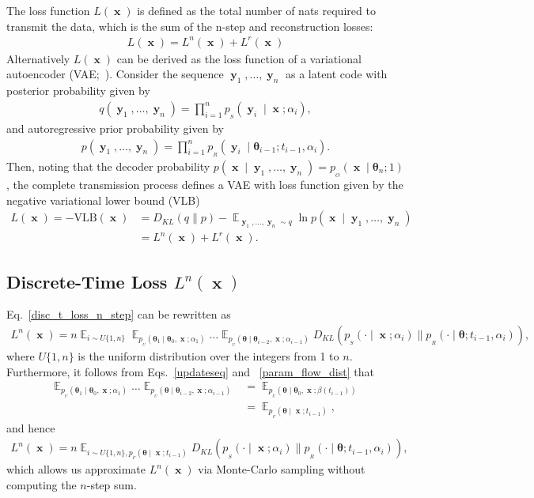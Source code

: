 \documentclass[11pt,table]{article}
\DeclareMathOperator*{\E}{\mathbb{E}}
\DeclareMathOperator{\x}{\mathbf{x}}
\DeclareMathOperator{\y}{\mathbf{y}}
\newcommand{\kl}[2]{D_{KL}\left(#1 \parallel #2\right)}
\newcommand{\tidx}[2]{#1_{#2}}
\renewcommand{\vec}[1]{\boldsymbol{#1}}
\newcommand{\pars}{\theta}
\newcommand{\parsn}{\vec{\pars}}
\newcommand{\parsnt}[1]{\tidx{\parsn}{#1}}
\newcommand{\alphat}[1]{\tidx{\alpha}{#1}}
\newcommand{\yt}[1]{\tidx{\y}{#1}}
\newcommand{\0}[1]{\constvec{0}{#1}}
\newcommand{\1}[1]{\constvec{1}{#1}}
\newcommand{\ds}[1]{\{1,#1\}}
\newcommand{\ui}[1]{U\ds{#1}}
\newcommand{\sender}[2]{p_{_S}\left(#1 \mid #2\right)}
\newcommand{\out}{p_{_O}}
\newcommand{\rec}{p_{_R}}
\newcommand{\flow}{p_{_F}}
\newcommand{\update}{p_{_U}}
\begin{document}
The loss function $L(\x)$ is defined as the total number of nats required to transmit the data, which is the sum of the n-step and reconstruction losses:
\begin{align}
L(\x) = L^n(\x) + L^r(\x)
\end{align}
Alternatively  $L(\x)$ can be derived as the loss function of a variational autoencoder (VAE;~\citep{kingma2013auto}). Consider the sequence $\yt{1},\dots,\yt{n}$ as a latent code with posterior probability given by
\begin{align}
q(\yt{1},\dots,\yt{n}) = \prod_{i=1}^n \sender{\y_i}{\x; \alpha_i},
\end{align}
and autoregressive prior probability given by
\begin{align}
p(\yt{1},\dots,\yt{n}) = \prod_{i=1}^n \rec(\y_i \mid \parsnt{i-1}; t_{i-1}, \alphat{i}).
\end{align}
Then, noting that the decoder probability $p(\x \mid \yt{1},\dots,\yt{n}) = \out(\x \mid \parsnt{n}; 1)$, the complete transmission process defines a VAE with loss function given by the negative variational lower bound (VLB)
\begin{align}
L(\x) = - \text{VLB}(\x) &= \kl{q}{p} - \E_{\yt{1},\dots,\yt{n} \sim q} \ln p(\x \mid \yt{1},\dots,\yt{n})\label{vae_loss}\\
&=L^n(\x) + L^r(\x).
\end{align}
\subsection{Discrete-Time Loss \texorpdfstring{$L^{n}(\x)$}{}}
Eq.~\ref{disc_t_loss_n_step} can be rewritten as
\begin{align}
L^{n}(\x) = n\E_{i \sim \ui{n}} \E_{\update(\parsnt{1} \mid \parsnt{0}, \x ; \alphat{1})}\dots\E_{\update(\parsn \mid \parsnt{i-2}, \x ; \alphat{i-1})} \kl{\sender{\cdot}{\x ; \alphat{i}}}{\rec(\cdot \mid \parsn ; t_{i-1}, \alphat{i})},
\end{align}
where $\ui{n}$ is the uniform distribution over the integers from 1 to $n$.
Furthermore, it follows from Eqs.~\ref{updateseq} and ~\ref{param_flow_dist} that
\begin{align}
\E_{\update(\parsnt{1} \mid \parsnt{0}, \x ; \alphat{1})}\dots\E_{\update(\parsn \mid \parsnt{i-2}, \x ; \alphat{i-1})} &= \E_{\update(\parsn \mid \parsnt{0}, \x ; \beta(t_{i-1}))}\\
&= \E_{\flow(\parsn \mid \x ; t_{i-1})},
\end{align}
and hence
\begin{align}
L^{n}(\x) = n \E_{i \sim \ui{n}, \flow(\parsn \mid \x ; t_{i-1})} \kl{\sender{\cdot}{\x ; \alphat{i}}}{\rec(\cdot \mid \parsn; t_{i-1}, \alphat{i})}\label{disc_t_loss_exp},
\end{align}
which allows us approximate $L^{n}(\x)$ via Monte-Carlo sampling without computing the $n$-step sum.
\end{document}

